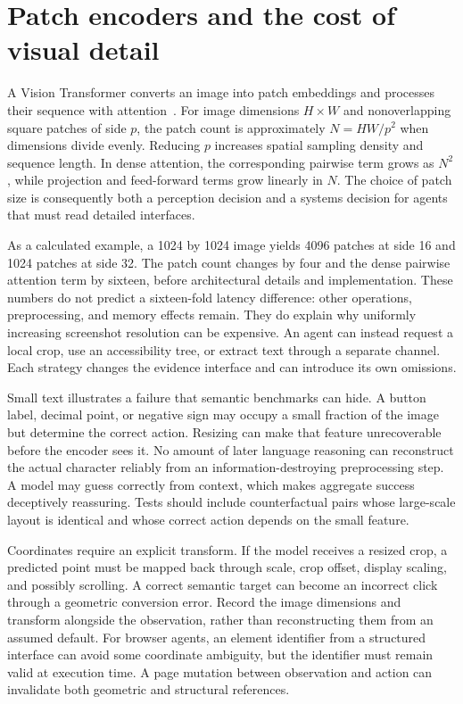 \section{Patch encoders and the cost of visual detail}
\label{sec:C05:vision}
A Vision Transformer converts an image into patch embeddings and processes their sequence with attention~\cite{dosovitskiy2020vit}. For image dimensions $H\times W$ and nonoverlapping square patches of side $p$, the patch count is approximately $N=HW/p^2$ when dimensions divide evenly. Reducing $p$ increases spatial sampling density and sequence length. In dense attention, the corresponding pairwise term grows as $N^2$, while projection and feed-forward terms grow linearly in $N$. The choice of patch size is consequently both a perception decision and a systems decision for agents that must read detailed interfaces.

As a calculated example, a 1024 by 1024 image yields 4096 patches at side 16 and 1024 patches at side 32. The patch count changes by four and the dense pairwise attention term by sixteen, before architectural details and implementation. These numbers do not predict a sixteen-fold latency difference: other operations, preprocessing, and memory effects remain. They do explain why uniformly increasing screenshot resolution can be expensive. An agent can instead request a local crop, use an accessibility tree, or extract text through a separate channel. Each strategy changes the evidence interface and can introduce its own omissions.

Small text illustrates a failure that semantic benchmarks can hide. A button label, decimal point, or negative sign may occupy a small fraction of the image but determine the correct action. Resizing can make that feature unrecoverable before the encoder sees it. No amount of later language reasoning can reconstruct the actual character reliably from an information-destroying preprocessing step. A model may guess correctly from context, which makes aggregate success deceptively reassuring. Tests should include counterfactual pairs whose large-scale layout is identical and whose correct action depends on the small feature.

Coordinates require an explicit transform. If the model receives a resized crop, a predicted point must be mapped back through scale, crop offset, display scaling, and possibly scrolling. A correct semantic target can become an incorrect click through a geometric conversion error. Record the image dimensions and transform alongside the observation, rather than reconstructing them from an assumed default. For browser agents, an element identifier from a structured interface can avoid some coordinate ambiguity, but the identifier must remain valid at execution time. A page mutation between observation and action can invalidate both geometric and structural references.

